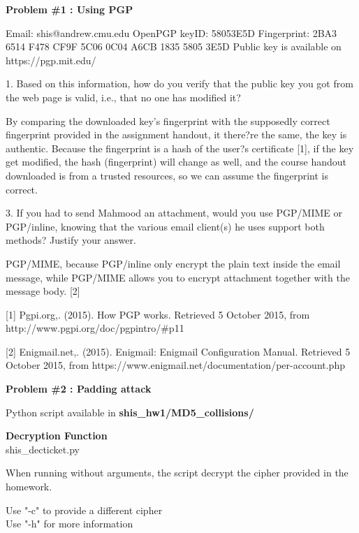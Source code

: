 \documentclass[12pt]{article}  %
\begin{document}
\begin{center}
\textbf{Problem \#1 : Using PGP}
\end{center}

Email: shis@andrew.cmu.edu
OpenPGP keyID: 58053E5D
Fingerprint: 2BA3 6514 F478 CF9F 5C06  0C04 A6CB 1835 5805 3E5D
Public key is available on https://pgp.mit.edu/

1. Based on this information, how do you verify that the public key you got from the web page is valid, i.e., that no one has modified it?

By comparing the downloaded key's fingerprint with the supposedly correct fingerprint provided in the assignment handout, it there?re the same, the key is authentic. Because the fingerprint is a hash of the user?s certificate [1], if the key get modified, the hash (fingerprint) will change as well, and the course handout downloaded is from a trusted resources, so we can assume the fingerprint is correct.

3. If you had to send Mahmood an attachment, would you use PGP/MIME or PGP/inline, knowing that the various email client(s) he uses support both methods? Justify your answer.

PGP/MIME, because PGP/inline only encrypt the plain text inside the email message, while PGP/MIME allows you to encrypt attachment together with the message body. [2]

[1] Pgpi.org,. (2015). How PGP works. Retrieved 5 October 2015, from http://www.pgpi.org/doc/pgpintro/\#p11

[2] Enigmail.net,. (2015). Enigmail: Enigmail Configuration Manual. Retrieved 5 October 2015, from https://www.enigmail.net/documentation/per-account.php


\newpage
\begin{center}
\textbf{Problem \#2 : Padding attack}
\end{center}

Python script available in {\bf shis\_hw1\slash MD5\_collisions\slash}

{\bf Decryption Function}\\
shis\_decticket.py

When running without arguments, the script decrypt the cipher provided in the
homework.

Use "-c" to provide a different cipher\\
Use "-h" for more information\\
\end{document}
